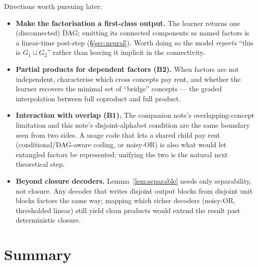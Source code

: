 \documentclass[11pt]{article}
\theoremstyle{definition}
\theoremstyle{plain}
\theoremstyle{remark}
\newcommand{\Gcoprod}{\sqcup}             %
\begin{document}
Directions worth pursuing later:
\begin{itemize}
  \item \textbf{Make the factorisation a first-class output.} The learner returns
        one (disconnected) DAG; emitting its connected components as named factors
        is a linear-time post-step (\S\ref{sec:neural}). Worth doing so the model
        \emph{reports} ``this is $G_1\Gcoprod G_2$'' rather than leaving it
        implicit in the connectivity.
  \item \textbf{Partial products for dependent factors (B2).} When factors are not
        independent, characterise which cross concepts pay rent, and whether the
        learner recovers the minimal set of ``bridge'' concepts --- the graded
        interpolation between full coproduct and full product.
  \item \textbf{Interaction with overlap (B1).} The companion note's
        overlapping-concept limitation and this note's disjoint-alphabet condition
        are the same boundary seen from two sides. A usage code that lets a shared
        child pay rent (conditional/DAG-aware coding, or noisy-OR) is also what
        would let entangled factors be represented; unifying the two is the natural
        next theoretical step.
  \item \textbf{Beyond closure decoders.} Lemma~\ref{lem:separable} needs only
        separability, not closure. Any decoder that writes disjoint output blocks
        from disjoint unit blocks factors the same way; mapping which richer
        decoders (noisy-OR, thresholded linear) still yield clean products would
        extend the result past deterministic closure.
\end{itemize}

\section*{Summary}
\end{document}

